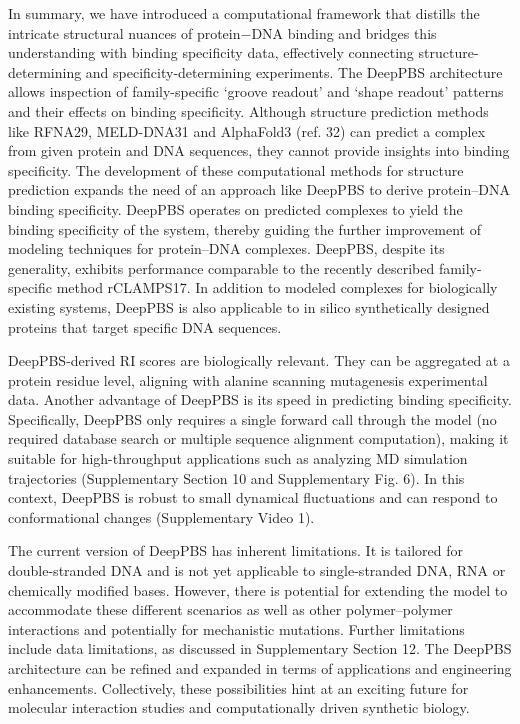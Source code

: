 \par
In summary, we have introduced a computational framework that distills the intricate structural nuances of protein$-$DNA binding and bridges this understanding with binding specificity data, effectively connecting structure-determining and specificity-determining experiments. The DeepPBS architecture allows inspection of family-specific ‘groove readout’ and ‘shape readout’ patterns and their effects on binding specificity. Although structure prediction methods like RFNA29, MELD-DNA31 and AlphaFold3 (ref. 32) can predict a complex from given protein and DNA sequences, they cannot provide insights into binding specificity. The development of these computational methods for structure prediction expands the need of an approach like DeepPBS to derive protein–DNA binding specificity. DeepPBS operates on predicted complexes to yield the binding specificity of the system, thereby guiding the further improvement of modeling techniques for protein–DNA complexes. DeepPBS, despite its generality, exhibits performance comparable to the recently described family-specific method rCLAMPS17. In addition to modeled complexes for biologically existing systems, DeepPBS is also applicable to in silico synthetically designed proteins that target specific DNA sequences.
\par
DeepPBS-derived RI scores are biologically relevant. They can be aggregated at a protein residue level, aligning with alanine scanning mutagenesis experimental data. Another advantage of DeepPBS is its speed in predicting binding specificity. Specifically, DeepPBS only requires a single forward call through the model (no required database search or multiple sequence alignment computation), making it suitable for high-throughput applications such as analyzing MD simulation trajectories (Supplementary Section 10 and Supplementary Fig. 6). In this context, DeepPBS is robust to small dynamical fluctuations and can respond to conformational changes (Supplementary Video 1).
\par
The current version of DeepPBS has inherent limitations. It is tailored for double-stranded DNA and is not yet applicable to single-stranded DNA, RNA or chemically modified bases. However, there is potential for extending the model to accommodate these different scenarios as well as other polymer–polymer interactions and potentially for mechanistic mutations. Further limitations include data limitations, as discussed in Supplementary Section 12. The DeepPBS architecture can be refined and expanded in terms of applications and engineering enhancements. Collectively, these possibilities hint at an exciting future for molecular interaction studies and computationally driven synthetic biology. 

